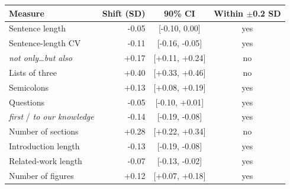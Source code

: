 \begin{tabular}{l r c c}
\toprule
Measure & Shift (SD) & 90\% CI & Within $\pm$0.2 SD \\
\midrule
Sentence length & -0.05 & [-0.10, 0.00] & yes \\
Sentence-length CV & -0.11 & [-0.16, -0.05] & yes \\
\textit{not only\ldots but also} & +0.17 & [+0.11, +0.24] & no \\
Lists of three & +0.40 & [+0.33, +0.46] & no \\
Semicolons & +0.13 & [+0.08, +0.19] & yes \\
Questions & -0.05 & [-0.10, +0.01] & yes \\
\textit{first} / \textit{to our knowledge} & -0.14 & [-0.19, -0.08] & yes \\
Number of sections & +0.28 & [+0.22, +0.34] & no \\
Introduction length & -0.13 & [-0.19, -0.08] & yes \\
Related-work length & -0.07 & [-0.13, -0.02] & yes \\
Number of figures & +0.12 & [+0.07, +0.18] & yes \\
\bottomrule
\end{tabular}
